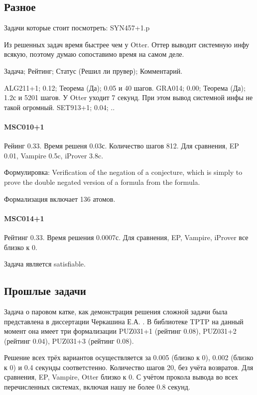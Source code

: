 \subsection{Разное}
Задачи которые стоит посмотреть:
SYN457+1.p

Из решенных задач время быстрее чем у Otter. Оттер выводит системную инфу всякую, поэтому думаю сопоставимо время на самом деле.

Задача; Рейтинг; Статус (Решил ли прувер); Комментарий.

ALG211+1; 0.12; Теорема (Да); 0.05 и 40 шагов.
GRA014; 0.00; Теорема (Да); 1.2с и 5201 шагов. У Otter уходит 7 секунд. При этом вывод системной инфы не такой огромный.
SET913+1; 0.04; ..


\paragraph{MSC010+1}
Рейинг 0.33. Время решеня 0.03с. Количество шагов 812. Для сравнения, EP 0.01, Vampire 0.5c, iProver 3.8c.

Формулировка: Verification of the negation of a conjecture, which is simply to prove the double negated version of a formula from the formula.

Формализация включает 136 атомов.



\paragraph{MSC014+1}
Рейтинг 0.33. Время решения 0.0007с. Для сравнения, EP, Vampire, iProver все близко к 0.

Задача является satisfiable.

\subsection{Прошлые задачи}
Задача о паровом катке, как демонстрация решения сложной задачи была представлена в диссертации Черкашина Е.А. \cite{dissChe}.
В библиотеке TPTP на данный момент она имеет три формализации PUZ031+1 (рейтинг 0.08), PUZ031+2 (рейтинг 0.04), PUZ031+3 (рейтинг 0.08). 

Решение всех трёх вариантов осуществляется за 0.005 (близко к 0), 0.002 (близко к 0) и 0.4 секунды соответстенно. Количество шагов 20, без учёта возвратов. Для сравнения, EP, Vampire, Otter близко к 0. С учётом прокола вывода во всех перечисленных системах, включая нашу не более 0.8 секунд.


